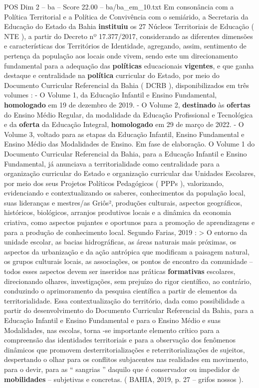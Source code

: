\begin{textsample}{POS Dim 2 – ba – Score 22.00 – ba/ba\_em\_10.txt}
Em consonância com a Política Territorial e a Política de Convivência com o semiárido, a Secretaria da Educação do Estado da Bahia \textbf{instituiu} os 27 Núcleos Territoriais de Educação ( NTE ), a partir do Decreto nº 17.377/2017, considerando as diferentes dimensões e características dos Territórios de Identidade, agregando, assim, sentimento de pertença da população aos locais onde vivem, sendo este um direcionamento fundamental para a adequação das \textbf{políticas} educacionais \textbf{vigentes}, e que ganha destaque e centralidade na \textbf{política} curricular do Estado, por meio do Documento Curricular Referencial da Bahia ( DCRB ), disponibilizados em três volumes : - O Volume 1, da Educação Infantil e Ensino Fundamental, \textbf{homologado} em 19 de dezembro de 2019. - O Volume 2, \textbf{destinado} às \textbf{ofertas} do Ensino Médio Regular, da modalidade da Educação Profissional e Tecnológica e da \textbf{oferta} da Educação Integral, \textbf{homologado} em 29 de março de 2022. - O Volume 3, voltado para as etapas da Educação Infantil, Ensino Fundamental e Ensino Médio das Modalidades de Ensino.
Em fase de elaboração.
O Volume 1 do Documento Curricular Referencial da Bahia, para a Educação Infantil e Ensino Fundamental, já anunciava a territorialidade como centralidade para a organização curricular do Estado e organização curricular das Unidades Escolares, por meio dos seus Projetos Políticos Pedagógicos ( PPPs ), valorizando, evidenciando e contextualizando os saberes, conhecimentos da população local, suas lideranças e mestres/as Griôs², produções culturais, aspectos geográficos, históricos, biológicos, arranjos produtivos locais e a dinâmica da economia criativa, como aspectos pujantes e oportunos para a promoção de aprendizagens e para a produção de conhecimento local.
Segundo Farias, 2019 : > O entorno da unidade escolar, as bacias hidrográficas, as áreas naturais mais próximas, os aspectos da urbanização e da ação antrópica que modificam a paisagem natural, os grupos culturais locais, as associações, os pontos de encontro da comunidade – todos esses aspectos devem ser inseridos nas práticas \textbf{formativas} escolares, direcionando olhares, investigações, sem prejuízo do rigor científico, ao contrário, conduzindo o aprimoramento da pesquisa científica a partir de elementos da territorialidade.
Essa contextualização do território, dada como possibilidade a partir do desenvolvimento do Documento Curricular Referencial da Bahia, para a Educação Infantil e Ensino Fundamental e para o Ensino Médio e suas Modalidades, nas escolas, torna -se importante elemento crítico para a compreensão das identidades territoriais e para a observação dos fenômenos dinâmicos que promovem desterritorializações e reterritorializações de sujeitos, despertando o olhar para os conflitos subjacentes nas realidades em movimento, para o devir, para as “ sangrias ” daquilo que é conservador ou impedidor de \textbf{mobilidades} – subjetivas e concretas. ( BAHIA, 2019, p. 27 – grifos nossos ).

\end{textsample}
